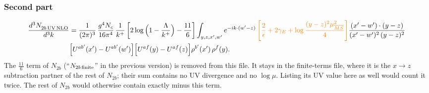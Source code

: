 \documentclass[9pt]{article}
\numberwithin{equation}{section}
\begin{document}
\subsubsection*{Second part}
\begin{align}
\frac{d^{3}N_{2b\,\rm UV\, NLO}^{\rm}}{d^{3}k} & = \frac{1}{(2\pi)^{3}}\,\frac{g^{4}N_{c}}{16\pi^{4}}\,\frac{1}{k^{+}}
\left[2\log\Big(1-\frac{\Lambda}{k^{+}}\Big)-\frac{11}{6}\right]\int_{y,z,x',w'}e^{-ik\cdot(w'-z)}\, {\color{orange}\left[\frac{2}{\epsilon}+2\gamma_{E}+\log\frac{(y-z)^{2}\mu^{2}_{\overline{MS}}}{4}\right]}
\frac{(x'-w')\cdot(y-z)}{(x'-w')^{2}\,(y-z)^{2}}\notag \\ &  \Big[U^{ab'}(x')-U^{ab'}(w')\Big]\Big[U^{af}(y)-U^{af}(z)\Big]\rho^{b'}(x')\,\rho^{f}(y).
\end{align}
{\color{red}The $\frac{11}{6}$ term of $N_{2b}$ (``$N_{2b\,\rm finite}$'' in the previous version) is removed from this file. It stays in the finite-terms file, where it is the $x\to z$ subtraction partner of the rest of $N_{2b}$; their sum contains no UV divergence and no $\log\mu$. Listing its UV value here as well would count it twice. The rest of $N_{2b}$ would otherwise contain exactly minus this term.}
\end{document}
